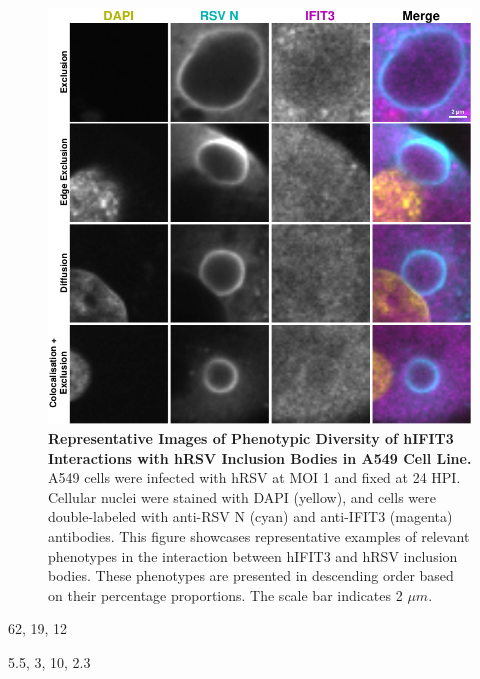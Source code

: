 \begin{figure}
    \centering
    \includegraphics[width=1\linewidth]{08. Chapter 3/Figs/02. Infection/03. IFIT3/03. a549 i3.pdf}
    \caption[Representative Images of Phenotypic Diversity of hIFIT3 Interactions with hRSV Inclusion Bodies in A549 Cell Line.]{\textbf{Representative Images of Phenotypic Diversity of hIFIT3 Interactions with hRSV Inclusion Bodies in A549 Cell Line.} A549 cells were infected with hRSV at MOI 1 and fixed at 24 HPI. Cellular nuclei were stained with DAPI (yellow), and cells were double-labeled with anti-RSV N (cyan) and anti-IFIT3 (magenta) antibodies. This figure showcases representative examples of relevant phenotypes in the interaction between hIFIT3 and hRSV inclusion bodies. These phenotypes are presented in descending order based on their percentage proportions. The scale bar indicates 2 \(\mu m\).}
    \label{fig:Representative Images of Phenotypic Diversity of hIFIT3 Interactions with hRSV Inclusion Bodies in A549 Cell Line}
\end{figure}

62, 19, 12

5.5, 3, 10, 2.3

